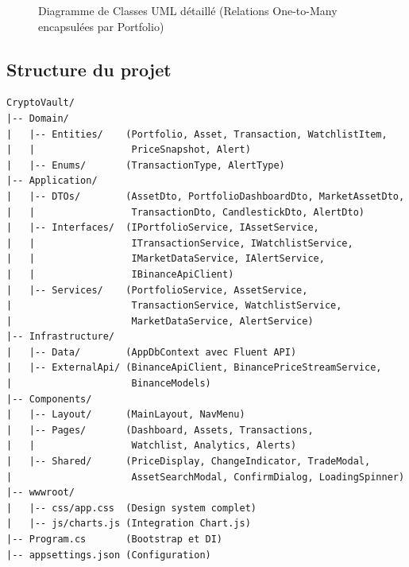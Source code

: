 \documentclass[12pt,a4paper]{article}
\begin{document}
\begin{figure}[H]
{
}
\caption{Diagramme de Classes UML détaillé (Relations One-to-Many encapsulées par Portfolio)}
\end{figure}

\subsection{Structure du projet}

\begin{lstlisting}[caption={Arborescence du projet CryptoVault},language={}]
CryptoVault/
|-- Domain/
|   |-- Entities/    (Portfolio, Asset, Transaction, WatchlistItem,
|   |                 PriceSnapshot, Alert)
|   |-- Enums/       (TransactionType, AlertType)
|-- Application/
|   |-- DTOs/        (AssetDto, PortfolioDashboardDto, MarketAssetDto,
|   |                 TransactionDto, CandlestickDto, AlertDto)
|   |-- Interfaces/  (IPortfolioService, IAssetService,
|   |                 ITransactionService, IWatchlistService,
|   |                 IMarketDataService, IAlertService,
|   |                 IBinanceApiClient)
|   |-- Services/    (PortfolioService, AssetService,
|                     TransactionService, WatchlistService,
|                     MarketDataService, AlertService)
|-- Infrastructure/
|   |-- Data/        (AppDbContext avec Fluent API)
|   |-- ExternalApi/ (BinanceApiClient, BinancePriceStreamService,
|                     BinanceModels)
|-- Components/
|   |-- Layout/      (MainLayout, NavMenu)
|   |-- Pages/       (Dashboard, Assets, Transactions,
|   |                 Watchlist, Analytics, Alerts)
|   |-- Shared/      (PriceDisplay, ChangeIndicator, TradeModal,
|                     AssetSearchModal, ConfirmDialog, LoadingSpinner)
|-- wwwroot/
|   |-- css/app.css  (Design system complet)
|   |-- js/charts.js (Integration Chart.js)
|-- Program.cs       (Bootstrap et DI)
|-- appsettings.json (Configuration)
\end{lstlisting}
\end{document}
